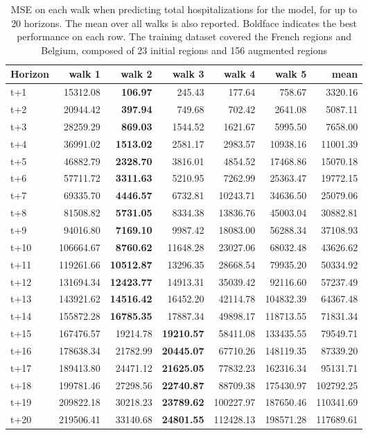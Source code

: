 \begin{table}[H]
\centering
\caption{MSE on each walk when predicting total hospitalizations for the model, for up to 20 horizons. The mean over all walks is also reported. Boldface indicates the best performance on each row. The training dataset covered the French regions and Belgium, composed of 23 initial regions and 156 augmented regions }
\label{tab:MSE_walk_baseline}
\begin{tabular}{lrrrrrr}
\toprule
Horizon &    walk 1 &   walk 2 &   walk 3 &    walk 4 &    walk 5 &      mean \\
\midrule
t+1  & 15312.08  & \textbf{106.97}  & 245.43  & 177.64  & 758.67  & 3320.16  \\
t+2  & 20944.42  & \textbf{397.94}  & 749.68  & 702.42  & 2641.08  & 5087.11  \\
t+3  & 28259.29  & \textbf{869.03}  & 1544.52  & 1621.67  & 5995.50  & 7658.00  \\
t+4  & 36991.02  & \textbf{1513.02}  & 2581.17  & 2983.57  & 10938.16  & 11001.39  \\
t+5  & 46882.79  & \textbf{2328.70}  & 3816.01  & 4854.52  & 17468.86  & 15070.18  \\
t+6  & 57711.72  & \textbf{3311.63}  & 5210.95  & 7262.99  & 25363.47  & 19772.15  \\
t+7  & 69335.70  & \textbf{4446.57}  & 6732.81  & 10243.71  & 34636.50  & 25079.06  \\
t+8  & 81508.82  & \textbf{5731.05}  & 8334.38  & 13836.76  & 45003.04  & 30882.81  \\
t+9  & 94016.80  & \textbf{7169.10}  & 9987.42  & 18083.00  & 56288.34  & 37108.93  \\
t+10  & 106664.67  & \textbf{8760.62}  & 11648.28  & 23027.06  & 68032.48  & 43626.62  \\
t+11  & 119261.66  & \textbf{10512.87}  & 13296.35  & 28668.54  & 79935.20  & 50334.92  \\
t+12  & 131694.34  & \textbf{12423.77}  & 14913.31  & 35039.42  & 92116.60  & 57237.49  \\
t+13  & 143921.62  & \textbf{14516.42}  & 16452.20  & 42114.78  & 104832.39  & 64367.48  \\
t+14  & 155872.28  & \textbf{16785.35}  & 17887.34  & 49898.17  & 118713.55  & 71831.34  \\
t+15  & 167476.57  & 19214.78  & \textbf{19210.57}  & 58411.08  & 133435.55  & 79549.71  \\
t+16  & 178638.34  & 21782.99  & \textbf{20445.07}  & 67710.26  & 148119.35  & 87339.20  \\
t+17  & 189413.80  & 24471.12  & \textbf{21625.05}  & 77832.23  & 162316.34  & 95131.71  \\
t+18  & 199781.46  & 27298.56  & \textbf{22740.87}  & 88709.38  & 175430.97  & 102792.25  \\
t+19  & 209822.18  & 30218.23  & \textbf{23789.62}  & 100227.97  & 187650.46  & 110341.69  \\
t+20  & 219506.41  & 33140.68  & \textbf{24801.55}  & 112428.13  & 198571.28  & 117689.61  \\

\bottomrule
\end{tabular}
\end{table}

